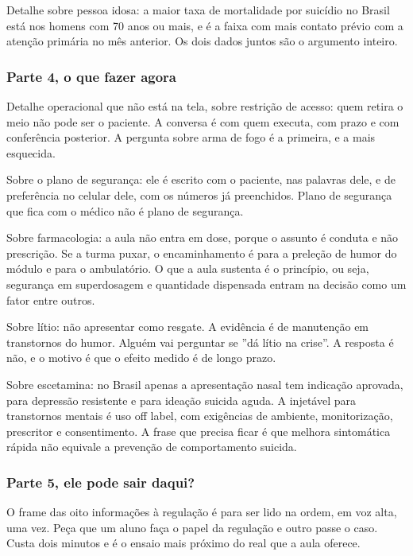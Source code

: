 Detalhe sobre pessoa idosa: a maior taxa de mortalidade por suicídio no Brasil está nos homens com 70 anos ou mais, e é a faixa com mais contato prévio com a atenção primária no mês anterior. Os dois dados juntos são o argumento inteiro.

\subsubsection*{Parte 4, o que fazer agora}

Detalhe operacional que não está na tela, sobre restrição de acesso: quem retira o meio não pode ser o paciente. A conversa é com quem executa, com prazo e com conferência posterior. A pergunta sobre arma de fogo é a primeira, e a mais esquecida.

Sobre o plano de segurança: ele é escrito com o paciente, nas palavras dele, e de preferência no celular dele, com os números já preenchidos. Plano de segurança que fica com o médico não é plano de segurança.

Sobre farmacologia: a aula não entra em dose, porque o assunto é conduta e não prescrição. Se a turma puxar, o encaminhamento é para a preleção de humor do módulo e para o ambulatório. O que a aula sustenta é o princípio, ou seja, segurança em superdosagem e quantidade dispensada entram na decisão como um fator entre outros.

Sobre lítio: não apresentar como resgate. A evidência é de manutenção em transtornos do humor. Alguém vai perguntar se ''dá lítio na crise''. A resposta é não, e o motivo é que o efeito medido é de longo prazo.

Sobre escetamina: no Brasil apenas a apresentação nasal tem indicação aprovada, para depressão resistente e para ideação suicida aguda. A injetável para transtornos mentais é uso off label, com exigências de ambiente, monitorização, prescritor e consentimento. A frase que precisa ficar é que melhora sintomática rápida não equivale a prevenção de comportamento suicida.

\subsubsection*{Parte 5, ele pode sair daqui?}

O frame das oito informações à regulação é para ser lido na ordem, em voz alta, uma vez. Peça que um aluno faça o papel da regulação e outro passe o caso. Custa dois minutos e é o ensaio mais próximo do real que a aula oferece.

